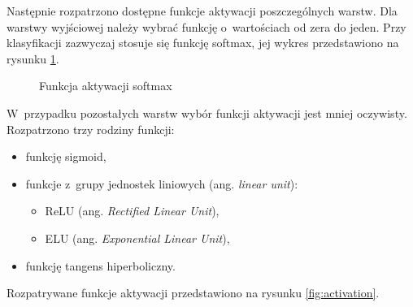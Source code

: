 Następnie rozpatrzono dostępne funkcje aktywacji poszczególnych warstw.
Dla warstwy wyjściowej należy wybrać funkcję o~wartościach od zera do jeden.
Przy klasyfikacji zazwyczaj stosuje się funkcję softmax, jej wykres
przedstawiono na rysunku \ref{fig:softmax}.
\begin{figure}[htbp]
\centering
{}
\caption{Funkcja aktywacji softmax}
\label{fig:softmax}
\end{figure}
W~przypadku pozostałych warstw wybór funkcji aktywacji jest mniej oczywisty.
Rozpatrzono trzy rodziny funkcji:
\begin{itemize}
	\item funkcję sigmoid,
	\item funkcje z~grupy jednostek liniowych (ang. \emph{linear unit}):
		\begin{itemize}	
        	\item ReLU (ang. \emph{Rectified Linear Unit}),
        	\item ELU (ang. \emph{Exponential Linear Unit}),
        \end{itemize}
	\item funkcję tangens hiperboliczny.
\end{itemize}
Rozpatrywane funkcje aktywacji przedstawiono na rysunku \ref{fig:activation}.
